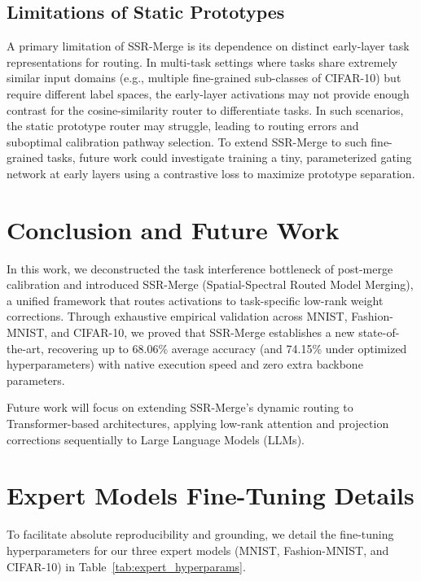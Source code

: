 \documentclass{article}
\theoremstyle{plain}
\theoremstyle{definition}
\theoremstyle{remark}
\begin{document}
\subsection{Limitations of Static Prototypes}
A primary limitation of SSR-Merge is its dependence on distinct early-layer task representations for routing. In multi-task settings where tasks share extremely similar input domains (e.g., multiple fine-grained sub-classes of CIFAR-10) but require different label spaces, the early-layer activations may not provide enough contrast for the cosine-similarity router to differentiate tasks. In such scenarios, the static prototype router may struggle, leading to routing errors and suboptimal calibration pathway selection. To extend SSR-Merge to such fine-grained tasks, future work could investigate training a tiny, parameterized gating network at early layers using a contrastive loss to maximize prototype separation.

\section{Conclusion and Future Work}
\label{submission:conclusion}
In this work, we deconstructed the task interference bottleneck of post-merge calibration and introduced SSR-Merge (Spatial-Spectral Routed Model Merging), a unified framework that routes activations to task-specific low-rank weight corrections. Through exhaustive empirical validation across MNIST, Fashion-MNIST, and CIFAR-10, we proved that SSR-Merge establishes a new state-of-the-art, recovering up to 68.06\% average accuracy (and 74.15\% under optimized hyperparameters) with native execution speed and zero extra backbone parameters.

Future work will focus on extending SSR-Merge's dynamic routing to Transformer-based architectures, applying low-rank attention and projection corrections sequentially to Large Language Models (LLMs).

\nocite{*}



\clearpage
\appendix
\onecolumn

\section{Expert Models Fine-Tuning Details}
To facilitate absolute reproducibility and grounding, we detail the fine-tuning hyperparameters for our three expert models (MNIST, Fashion-MNIST, and CIFAR-10) in Table~\ref{tab:expert_hyperparams}.
\end{document}
